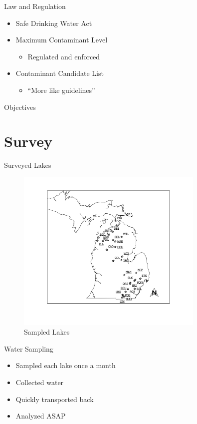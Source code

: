 \begin{frame}{Law and Regulation}

	\begin{itemize}
		\item Safe Drinking Water Act
		\item Maximum Contaminant Level
		\begin{itemize}
			\item Regulated and enforced
		\end{itemize}
		\item Contaminant Candidate List
		\begin{itemize}
			\item ``More like guidelines''
		\end{itemize}
	\end{itemize}
\end{frame}
\begin{frame}{Objectives}

\end{frame}
\section{Survey}
\begin{frame}{Surveyed Lakes}

\begin{figure}
	\centering
	\includegraphics[width=0.8\textwidth,height=\textheight]{../figures/Overview.png}
	\caption{Sampled Lakes}
\end{figure}

\end{frame}

\begin{frame}{Water Sampling}

	\begin{itemize}
		\item Sampled each lake once a month
		\item Collected water
		\item Quickly transported back
		\item Analyzed ASAP
	\end{itemize}

\end{frame}

